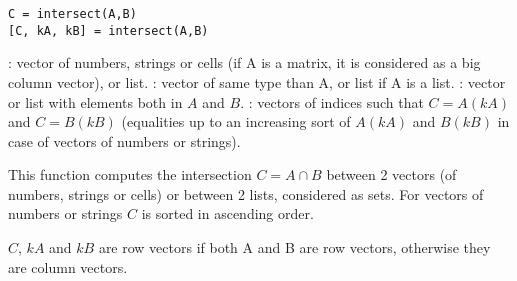 
\begin{mandesc}
\end{mandesc}

\begin{calling_sequence}
\begin{verbatim}
C = intersect(A,B)
[C, kA, kB] = intersect(A,B)
\end{verbatim}
\end{calling_sequence}
\begin{parameters}
  \begin{varlist}
     : vector of numbers, strings or cells (if A is a matrix, it is
    considered as a big column vector), or list.
     : vector of same type than A, or list if A is a list. 
     : vector or list with elements both in  $A$ and $B$.
     : vectors of indices such that $C = A(kA)$ and $C =
    B(kB)$ (equalities up to an increasing sort of $A(kA)$ and $B(kB)$
    in case of vectors of numbers or strings). 
  \end{varlist}
\end{parameters}

\begin{mandescription}
  This function computes the intersection $C = A \cap B$
  between 2 vectors (of numbers, strings or cells) or between 2
  lists, considered as sets. For vectors of numbers or strings
  $C$ is sorted in ascending order.

  $C$, $kA$ and $kB$ are row vectors if both A and B are row vectors, otherwise they
  are column vectors.
  
\end{mandescription}

